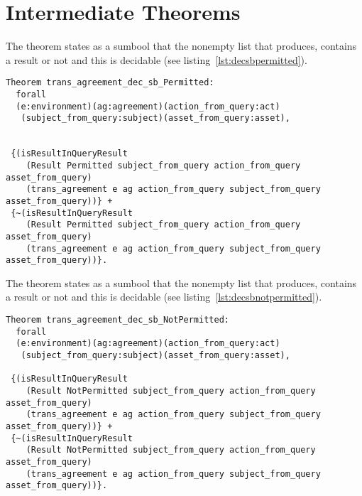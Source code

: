 \section{Intermediate Theorems}\label{sec:intermediatetheorems}
The theorem  states as a sumbool that the nonempty list that  produces, contains a  result or not and this is decidable (see listing~\ref{lst:decsbpermitted}).


\begin{lstlisting}
Theorem trans_agreement_dec_sb_Permitted:
  forall
  (e:environment)(ag:agreement)(action_from_query:act)
   (subject_from_query:subject)(asset_from_query:asset),


 {(isResultInQueryResult 
    (Result Permitted subject_from_query action_from_query asset_from_query)
    (trans_agreement e ag action_from_query subject_from_query asset_from_query))} +
 {~(isResultInQueryResult 
    (Result Permitted subject_from_query action_from_query asset_from_query)
    (trans_agreement e ag action_from_query subject_from_query asset_from_query))}.

\end{lstlisting}

The theorem  states as a sumbool that the nonempty list that  produces, contains a  result or not and this is decidable (see listing~\ref{lst:decsbnotpermitted}).

\begin{lstlisting}
Theorem trans_agreement_dec_sb_NotPermitted:
  forall
  (e:environment)(ag:agreement)(action_from_query:act)
   (subject_from_query:subject)(asset_from_query:asset),

 {(isResultInQueryResult 
    (Result NotPermitted subject_from_query action_from_query asset_from_query)
    (trans_agreement e ag action_from_query subject_from_query asset_from_query))} +
 {~(isResultInQueryResult 
    (Result NotPermitted subject_from_query action_from_query asset_from_query)
    (trans_agreement e ag action_from_query subject_from_query asset_from_query))}.

\end{lstlisting}

